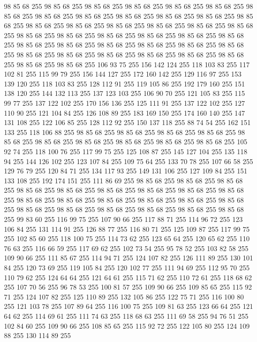 98 85 68 255 98 85 68 255 98 85 68 255 98 85 68 255 98 85 68 255 98 85 68 255 98 85 68 255 98 85 68 255 98 85 68 255 98 85 68 255 98 85 68 255 98 85 68 255 98 85 68 255 98 85 68 255 98 85 68 255 98 85 68 255 98 85 68 255 98 85 68 255 98 85 68 255 98 85 68 255 98 85 68 255 98 85 68 255 98 85 68 255 98 85 68 255 98 85 68 255 98 85 68 255 98 85 68 255 98 85 68 255 98 85 68 255 98 85 68 255 98 85 68 255 98 85 68 255 98 85 68 255 98 85 68 255 98 85 68 255 98 85 68 255 98 85 68 255 98 85 68 255 98 85 68 255 106 93 75 255 156 142 124 255 118 103 83 255 117 102 81 255 115 99 79 255 156 144 127 255 172 160 142 255 129 116 97 255 153 139 120 255 118 103 83 255 128 112 91 255 119 105 86 255 192 179 160 255 151 138 120 255 144 132 113 255 137 123 103 255 106 90 70 255 121 105 83 255 115 99 77 255 137 122 102 255 170 156 136 255 125 111 91 255 137 122 102 255 127 110 90 255 121 104 84 255
126 108 89 255 183 169 150 255 174 160 140 255 147 131 108 255 122 106 85 255 128 112 92 255 150 137 118 255 88 74 54 255 162 151 133 255 118 106 88 255 98 85 68 255 98 85 68 255 98 85 68 255 98 85 68 255 98 85 68 255 98 85 68 255 98 85 68 255 98 85 68 255 98 85 68 255 98 85 68 255 105 92 74 255 118 100 76 255 117 99 75 255 125 108 87 255 145 127 104 255 135 118 94 255 144 126 102 255 123 107 84 255 109 75 64 255 133 70 78 255 107 66 58 255 129 76 79 255 120 84 71 255 134 117 93 255 149 131 106 255 127 109 84 255 151 133 108 255 192 174 151 255 111 86 69 255 98 85 68 255 98 85 68 255 98 85 68 255 98 85 68 255 98 85 68 255 98 85 68 255 98 85 68 255 98 85 68 255 98 85 68 255 98 85 68 255 98 85 68 255 98 85 68 255 98 85 68 255 98 85 68 255 98 85 68 255 98 85 68 255 98 85 68 255 98 85 68 255 98 85 68 255 98 85 68 255 98 85 68 255 99 83 60 255 116 99 75 255 107 90 66 255 117 88 71 255
114 96 72 255 123 106 84 255 131 114 91 255 126 88 77 255 116 80 71 255 125 109 87 255 117 99 75 255 102 85 60 255 118 100 75 255 114 73 62 255 123 65 64 255 120 65 62 255 110 76 63 255 116 66 59 255 117 69 62 255 102 73 54 255 95 78 52 255 103 82 58 255 109 90 66 255 111 85 67 255 114 94 71 255 124 107 82 255 126 111 89 255 130 101 84 255 120 73 69 255 119 105 84 255 120 102 77 255 111 94 69 255 112 95 70 255 110 79 62 255 124 64 64 255 121 64 61 255 115 71 62 255 110 72 61 255 118 68 62 255 107 70 56 255 96 78 53 255 100 81 57 255 109 90 66 255 109 85 65 255 115 92 71 255 124 107 82 255 125 110 89 255 132 105 86 255 122 75 71 255 116 100 80 255 121 103 78 255 107 89 64 255 116 100 75 255 109 81 63 255 123 66 64 255 121 64 62 255 114 69 61 255 111 74 63 255 118 68 63 255 111 69 58 255 94 76 51 255 102 84 60 255 109 90 66 255 108 85 65 255 115 92 72 255 122 105 80 255 124 109 88 255 130 114 89 255
